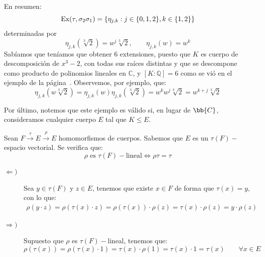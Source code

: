 \begin{ejemplo}
    En resumen:
    \begin{equation*}
        \operatorname{Ex}(\tau,\sigma_2\sigma_1) = \{\eta_{j,k} : j\in \{0,1,2\}, k\in \{1,2\}\}
    \end{equation*}
    determinadas por
    \begin{equation*}
        \eta_{j,k}\left(\sqrt[3]{2}\right) = w^j\sqrt[3]{2}, \qquad \eta_{j,k}(w)= w^k
    \end{equation*}
    Sabíamos que teníamos que obtener 6 extensiones, puesto que $K$ es cuerpo de descomposición de $x^3-2$, con todas sus raíces distintas y que se descompone como producto de polinomios lineales en $\mathbb{C}$, y $[K:\mathbb{Q}] = 6$ como se vió en el ejemplo de la página~\pageref{ej:Ordenwsqrt3_2}. Observemos, por ejemplo, que:
    \begin{equation*}
        \eta_{j,k}\left(w\sqrt[3]{2}\right) = \eta_{j,k}(w)\eta_{j,k}\left(\sqrt[3]{2}\right) = w^k w^j\sqrt[3]{2} = w^{k+j}\sqrt[3]{2}
    \end{equation*}

    Por último, notemos que este ejemplo es válido si, en lugar de $\bb{C}$, consideramos cualquier cuerpo $E$ tal que $K\leq E$.
\end{ejemplo}

\begin{ejercicio}\label{ej:F-lineal}
    Sean $F\stackrel{\tau}{\to}E\stackrel{\rho}{\to}E$ homomorfismos de cuerpos. Sabemos que $E$ es un $\tau(F)-$espacio vectorial. Se verifica que: 
    \begin{equation*}
        \rho \text{\ es\ } \tau(F)-\text{lineal} \Longleftrightarrow \rho\tau = \tau
    \end{equation*}

    \begin{description}
        \item [$\Longleftarrow )$] Sea $y\in \tau(F)$ y $z\in E$, tenemos que existe $x\in F$ de forma que $\tau(x)=y$, con lo que:
            \begin{align*}
                \rho(y\cdot z) = \rho(\tau(x)\cdot z) = \rho(\tau(x))\cdot \rho(z) = \tau(x)\cdot \rho(z) = y\cdot \rho(z)
            \end{align*}
        \item [$\Longrightarrow )$] Supuesto que $\rho$ es $\tau(F)-$lineal, tenemos que:
            \begin{equation*} 
                \rho(\tau(x)) = \rho(\tau(x)\cdot 1)= \tau(x)\cdot \rho(1) = \tau(x)\cdot 1 = \tau(x) \qquad \forall x\in E
            \end{equation*}
    \end{description}
\end{ejercicio}

